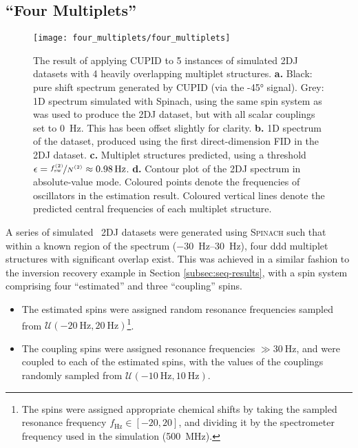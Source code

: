 \subsection{``Four Multiplets''}
\label{subsec:four-mp}
\begin{figure}
    \centering
    \texttt{[image: four\_multiplets/four\_multiplets]}
    \caption[
        The result of applying \acs{CUPID} to 5 instances of simulated
        \acs{2DJ} datasets with 4 heavily overlapping multiplet structures.
    ]{
        The result of applying \ac{CUPID} to 5 instances of simulated \ac{2DJ}
        datasets with 4 heavily overlapping multiplet structures.
        \textbf{a.} Black: pure shift spectrum generated by \ac{CUPID} (via the
        \ang{-45} signal).
        Grey: \ac{1D} spectrum simulated with Spinach, using the same spin
        system as was used to produce the \ac{2DJ} dataset, but with all scalar
        couplings set to \qty{0}{\hertz}. This has been offset slightly for
        clarity.
        \textbf{b.} \ac{1D} spectrum of the dataset, produced using the first
        direct-dimension \ac{FID} in the \ac{2DJ} dataset.
        \textbf{c.} Multiplet structures predicted, using a threshold $\epsilon
        = \nicefrac{\fswtwo}{\Ntwo} \approx \qty{0.98}{\hertz}$.
        \textbf{d.} Contour plot of the \ac{2DJ} spectrum in absolute-value
        mode. Coloured points denote the frequencies of oscillators in the
        estimation result.
        Coloured vertical lines denote the predicted central frequencies of
        each multiplet structure.
    }
    \label{fig:four-multiplets}
\end{figure}
A series of simulated \proton\ \ac{2DJ} datasets were generated using
\textsc{Spinach} such that within a known region of the spectrum
(\SIrange{-30}{30}{\hertz}), four ddd multiplet structures with significant
overlap exist. This was achieved in a similar fashion to the inversion recovery
example in Section \ref{subsec:seq-results}, with a spin system comprising
four ``estimated'' and three ``coupling'' spins.
\begin{itemize}
    \item The estimated spins were assigned random resonance frequencies
        sampled from $\mathcal{U}(\qty{-20}{\hertz}, \qty{20}{\hertz})$\footnote{
            The spins were assigned appropriate chemical shifts by taking the
            sampled resonance frequency $f_{\unit{\hertz}} \in [-20, 20]$, and
            dividing it by the spectrometer frequency used in the simulation
            (\qty{500}{\mega\hertz}).
        }.
    \item The coupling spins were assigned resonance frequencies $\gg
        \qty{30}{\hertz}$, and were coupled to each of the estimated spins,
        with the values of the couplings randomly sampled from
        $\mathcal{U}(\qty{-10}{\hertz}, \qty{10}{\hertz})$.
\end{itemize}
